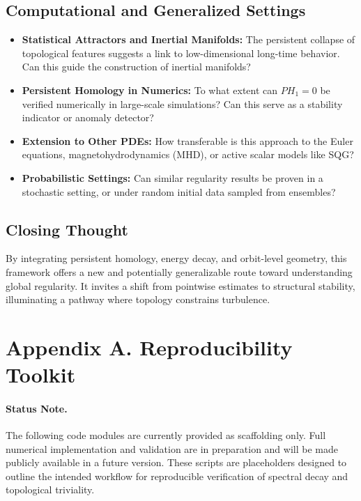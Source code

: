 \documentclass[11pt]{article}
\theoremstyle{definition}
\begin{document}
\subsection*{Computational and Generalized Settings}
\begin{itemize}
  \item \textbf{Statistical Attractors and Inertial Manifolds:} The persistent collapse of topological features suggests a link to low-dimensional long-time behavior. Can this guide the construction of inertial manifolds?
  \item \textbf{Persistent Homology in Numerics:} To what extent can $PH_1 = 0$ be verified numerically in large-scale simulations? Can this serve as a stability indicator or anomaly detector?
  \item \textbf{Extension to Other PDEs:} How transferable is this approach to the Euler equations, magnetohydrodynamics (MHD), or active scalar models like SQG?
  \item \textbf{Probabilistic Settings:} Can similar regularity results be proven in a stochastic setting, or under random initial data sampled from ensembles?
\end{itemize}

\subsection*{Closing Thought}
By integrating persistent homology, energy decay, and orbit-level geometry, this framework offers a new and potentially generalizable route toward understanding global regularity. It invites a shift from pointwise estimates to structural stability, illuminating a pathway where topology constrains turbulence.




\section{Appendix A. Reproducibility Toolkit}
\label{sec:appendixA}

\paragraph{Status Note.}
The following code modules are currently provided as scaffolding only. Full numerical implementation and validation are in preparation and will be made publicly available in a future version. These scripts are placeholders designed to outline the intended workflow for reproducible verification of spectral decay and topological triviality.
\end{document}

